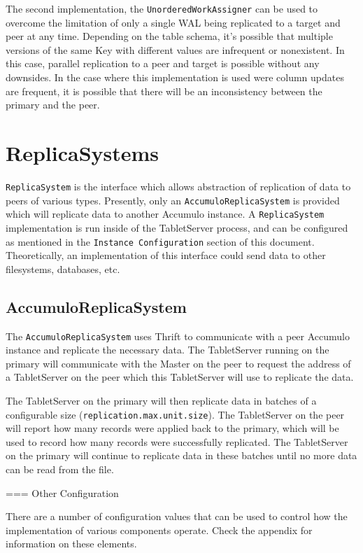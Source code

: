 The second implementation, the \texttt{UnorderedWorkAssigner} can be used to overcome the limitation
of only a single WAL being replicated to a target and peer at any time. Depending on the table schema,
it's possible that multiple versions of the same Key with different values are infrequent or nonexistent.
In this case, parallel replication to a peer and target is possible without any downsides. In the case
where this implementation is used were column updates are frequent, it is possible that there will be
an inconsistency between the primary and the peer.

\section{ReplicaSystems}

\texttt{ReplicaSystem} is the interface which allows abstraction of replication of data
to peers of various types. Presently, only an \texttt{AccumuloReplicaSystem} is provided
which will replicate data to another Accumulo instance. A \texttt{ReplicaSystem} implementation
is run inside of the TabletServer process, and can be configured as mentioned in the 
\texttt{Instance Configuration} section of this document. Theoretically, an implementation
of this interface could send data to other filesystems, databases, etc.

\subsection{ AccumuloReplicaSystem}

The \texttt{AccumuloReplicaSystem} uses Thrift to communicate with a peer Accumulo instance
and replicate the necessary data. The TabletServer running on the primary will communicate
with the Master on the peer to request the address of a TabletServer on the peer which
this TabletServer will use to replicate the data.

The TabletServer on the primary will then replicate data in batches of a configurable
size (\texttt{replication.max.unit.size}). The TabletServer on the peer will report how many
records were applied back to the primary, which will be used to record how many records
were successfully replicated. The TabletServer on the primary will continue to replicate
data in these batches until no more data can be read from the file.

=== Other Configuration

There are a number of configuration values that can be used to control how
the implementation of various components operate. Check the appendix for
information on these elements.

